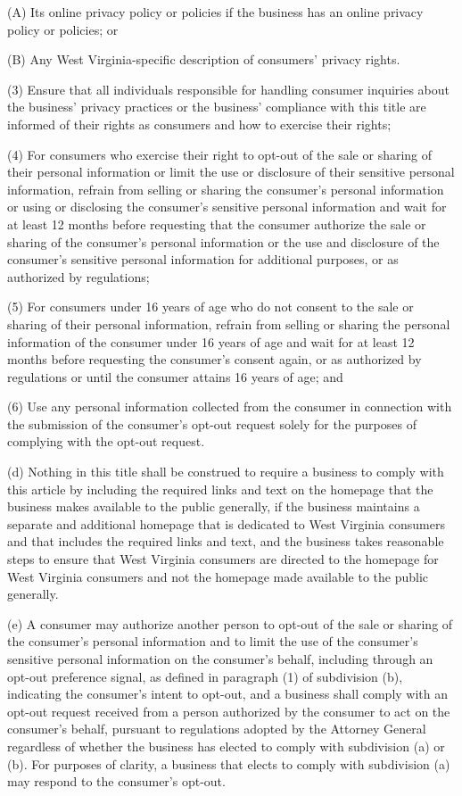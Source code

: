 (A) Its online privacy policy or policies if the business has an online privacy policy or policies; or

(B) Any West Virginia-specific description of consumers’ privacy rights.

(3) Ensure that all individuals responsible for handling consumer inquiries about the business’ privacy practices or the business’ compliance with this title are informed of their rights as consumers and how to exercise their rights;

(4) For consumers who exercise their right to opt-out of the sale or sharing of their personal information or limit the use or disclosure of their sensitive personal information, refrain from selling or sharing the consumer’s personal information or using or disclosing the consumer’s sensitive personal information and wait for at least 12 months before requesting that the consumer authorize the sale or sharing of the consumer’s personal information or the use and disclosure of the consumer’s sensitive personal information for additional purposes, or as authorized by regulations;

(5) For consumers under 16 years of age who do not consent to the sale or sharing of their personal information, refrain from selling or sharing the personal information of the consumer under 16 years of age and wait for at least 12 months before requesting the consumer’s consent again, or as authorized by regulations or until the consumer attains 16 years of age; and

(6) Use any personal information collected from the consumer in connection with the submission of the consumer’s opt-out request solely for the purposes of complying with the opt-out request.

(d) Nothing in this title shall be construed to require a business to comply with this article by including the required links and text on the homepage that the business makes available to the public generally, if the business maintains a separate and additional homepage that is dedicated to West Virginia consumers and that includes the required links and text, and the business takes reasonable steps to ensure that West Virginia consumers are directed to the homepage for West Virginia consumers and not the homepage made available to the public generally.

(e) A consumer may authorize another person to opt-out of the sale or sharing of the consumer’s personal information and to limit the use of the consumer’s sensitive personal information on the consumer’s behalf, including through an opt-out preference signal, as defined in paragraph (1) of subdivision (b), indicating the consumer’s intent to opt-out, and a business shall comply with an opt-out request received from a person authorized by the consumer to act on the consumer’s behalf, pursuant to regulations adopted by the Attorney General regardless of whether the business has elected to comply with subdivision (a) or (b). For purposes of clarity, a business that elects to comply with subdivision (a) may respond to the consumer’s opt-out.

